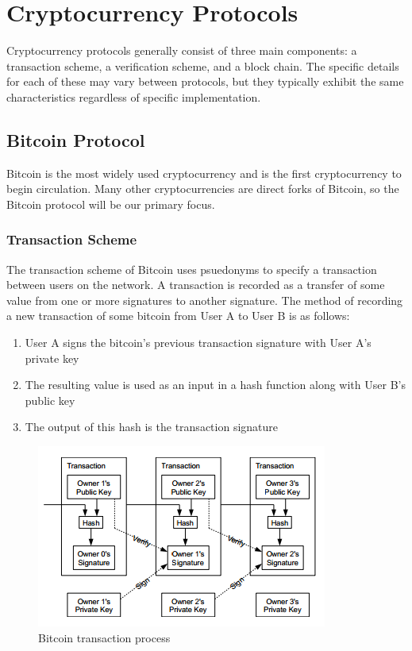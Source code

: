 \documentclass[11pt]{article}
\begin{document}
\section{Cryptocurrency Protocols}
Cryptocurrency protocols generally consist of three main components: a
transaction scheme, a verification scheme, and a block chain. The specific
details for each of these may vary between protocols, but they typically exhibit
the same characteristics regardless of specific implementation.

\subsection{Bitcoin Protocol}
Bitcoin is the most widely used cryptocurrency and is the first cryptocurrency
to begin circulation. Many other cryptocurrencies are direct forks of Bitcoin,
so the Bitcoin protocol will be our primary focus.

\subsubsection{Transaction Scheme}
The transaction scheme of Bitcoin uses psuedonyms to specify a transaction
between users on the network. A transaction is recorded as a transfer of some
value from one or more signatures to another signature. 
The method of recording a new transaction of some bitcoin from User A to User
B is as follows:
\begin{enumerate}
    \item User A signs the bitcoin's previous transaction signature with User
        A's private key
    \item The resulting value is used as an input in a hash function along
        with User B's public key
    \item The output of this hash is the transaction signature
\end{enumerate}
\begin{figure}[h]
    \caption{Bitcoin transaction process~\cite{Nakamoto08}}
    \centering
        \includegraphics{figures/transaction.png}
\end{figure}
\end{document}

